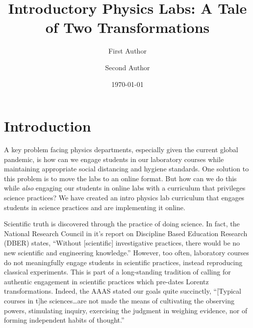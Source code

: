\documentclass[aip, numerical, preprint]{revtex4-2}
\begin{document}
\title{Introductory Physics Labs: A Tale of Two Transformations}


\author{First Author}  \author{Second Author}

\date{\today}


\maketitle

\section{Introduction}
 A key problem facing physics departments, especially given the current global pandemic, is
  how can we engage students in our laboratory courses while maintaining appropriate social
  distancing and hygiene standards.  One solution to this problem is to move the labs to an
  online format.  But how can we do this while \textit{also} engaging our students in online
  labs with a curriculum that privileges science practices?  We have created an intro physics
  lab curriculum that engages students in science practices and are implementing it online.

Scientific truth is discovered through the practice of doing science.  In fact, the National
Research Council in it's report on Discipline Based Education Research (DBER) states, ``Without
[scientific] investigative practices, there would be no new scientific and engineering
knowledge.''\cite{DBERreport} However, too often, laboratory courses do not meaningfully engage
students in scientific practices, instead reproducing classical experiments.\cite{PCAST12} This
is part of a long-standing tradition of calling for authentic engagement in scientific
practices which pre-dates Lorentz transformations.\cite{AAAS1881} Indeed, the AAAS stated our
goals quite succinctly, ``[Typical courses in t]he sciences\ldots are not made the means of
cultivating the observing powers, stimulating inquiry, exercising the judgment in weighing
evidence, nor of forming independent habits of thought.''\cite{AAAS1881}
\end{document}

